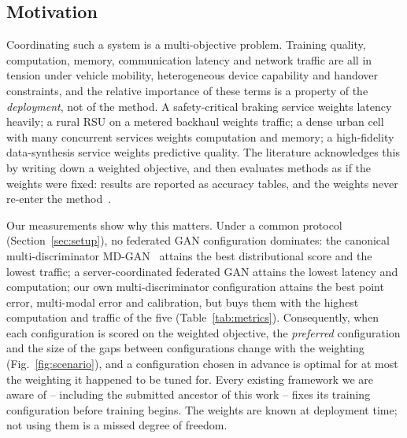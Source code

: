 \documentclass[journal]{IEEEtran}
\begin{document}
\subsection{Motivation}
\label{sec:motivation}
Coordinating such a system is a multi-objective problem. Training quality,
computation, memory, communication latency and network traffic are all in
tension under vehicle mobility, heterogeneous device capability and handover
constraints, and the relative importance of these terms is a property of the
\emph{deployment}, not of the method. A safety-critical braking service weights
latency heavily; a rural RSU on a metered backhaul weights traffic; a dense
urban cell with many concurrent services weights computation and memory; a
high-fidelity data-synthesis service weights predictive quality. The literature
acknowledges this by writing down a weighted objective, and then evaluates
methods as if the weights were fixed: results are reported as accuracy tables,
and the weights never re-enter the method~\cite{wang2022mdbiwgan,wu2024hvsgan,xie2024gaiiov}.

Our measurements show why this matters. Under a common protocol
(Section~\ref{sec:setup}), no federated GAN configuration dominates: the
canonical multi-discriminator MD-GAN~\cite{hardy2019mdgan} attains the best
distributional score and the lowest traffic; a server-coordinated federated GAN
attains the lowest latency and computation; our own multi-discriminator
configuration attains the best point error, multi-modal error and calibration,
but buys them with the highest computation and traffic of the five
(Table~\ref{tab:metrics}). Consequently, when each configuration is scored on
the weighted objective, the \emph{preferred} configuration and the size of the
gaps between configurations change with the weighting
(Fig.~\ref{fig:scenario}), and a configuration chosen in advance is optimal for
at most the weighting it happened to be tuned for. Every existing framework we
are aware of -- including the submitted ancestor of this work -- fixes its
training configuration before training begins. The weights are known at
deployment time; not using them is a missed degree of freedom.
\end{document}
